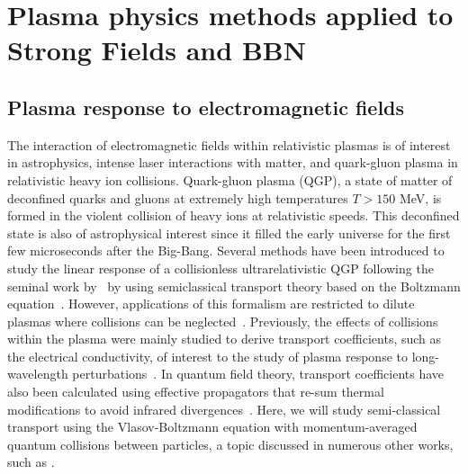 \section{Plasma physics methods applied to Strong Fields and BBN}\label{part4}
\subsection{Plasma response to electromagnetic fields}
\label{chap:PlasmaSF}

The interaction of electromagnetic fields within relativistic plasmas is of interest in astrophysics, intense laser interactions with matter, and quark-gluon plasma in relativistic heavy ion collisions. Quark-gluon plasma (QGP), a state of matter of deconfined quarks and gluons at extremely high temperatures $T>150$ MeV, is formed in the violent collision of heavy ions at relativistic speeds. This deconfined state is also of astrophysical interest since it filled the early universe for the first few microseconds after the Big-Bang. Several methods have been introduced to study the linear response of a collisionless ultrarelativistic QGP following the seminal work by~\cite{Weldon:1982aq} by using semiclassical transport theory based on the Boltzmann equation~\cite{Mrowczynski:1987jr,Mrowczynski:1989np,Blaizot:1993zk,Kelly:1994ig,Kelly:1994dh}. However, applications of this formalism are restricted to dilute plasmas where collisions can be neglected~\cite{Blaizot:2001nr}. 
Previously, the effects of collisions within the plasma were mainly studied to derive transport coefficients, such as the electrical conductivity, of interest to the study of plasma response to long-wavelength perturbations~\cite{Mrowczynski:1988xu,Heiselberg:1993cr,Ahonen:1996nq,Baym:1997gq,Ahonen:1998iz}. In quantum field theory, transport coefficients have also been calculated using effective propagators that re-sum thermal modifications to avoid infrared divergences~\cite{Heiselberg:1994ms,Arnold:2002zm,Arnold:2003zc}. Here, we will study semi-classical transport using the Vlasov-Boltzmann equation with momentum-averaged quantum collisions between particles, a topic discussed in numerous other works, such as \cite{DeGroot:1980dk,Cercignani:2002bk,Hakim:2011bk,Carrington:2003je,Schenke:2006xu}.


